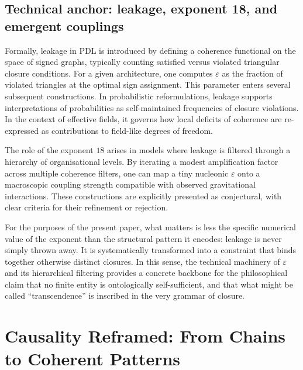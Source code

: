 \documentclass[11pt,a4paper]{article}
\theoremstyle{definition}
\begin{document}
\subsection{Technical anchor: leakage, exponent 18, and emergent couplings}

Formally, leakage in PDL is introduced by defining a coherence functional on the space of signed graphs, typically counting satisfied versus violated triangular closure conditions.\cite{Laubscher_Leakage_Probability_2024} For a given architecture, one computes \(\varepsilon\) as the fraction of violated triangles at the optimal sign assignment. This parameter enters several subsequent constructions. In probabilistic reformulations, leakage supports interpretations of probabilities as self-maintained frequencies of closure violations.\cite{Laubscher_Leakage_Probability_2024} In the context of effective fields, it governs how local deficits of coherence are re-expressed as contributions to field-like degrees of freedom.\cite{Laubscher_EffectiveFields_2024}

The role of the exponent \(18\) arises in models where leakage is filtered through a hierarchy of organisational levels.\cite{Laubscher_Exponent18_v2_2024} By iterating a modest amplification factor across multiple coherence filters, one can map a tiny nucleonic \(\varepsilon\) onto a macroscopic coupling strength compatible with observed gravitational interactions.\cite{Laubscher_UniversalCoherenceLeakage_2024} These constructions are explicitly presented as conjectural, with clear criteria for their refinement or rejection.\cite{Laubscher_PDL_Position_2024,Laubscher_PDL_GlobalMapping_v6_2024}

For the purposes of the present paper, what matters is less the specific numerical value of the exponent than the structural pattern it encodes: leakage is never simply thrown away. It is systematically transformed into a constraint that binds together otherwise distinct closures. In this sense, the technical machinery of \(\varepsilon\) and its hierarchical filtering provides a concrete backbone for the philosophical claim that no finite entity is ontologically self-sufficient, and that what might be called ``transcendence'' is inscribed in the very grammar of closure.

\section{Causality Reframed: From Chains to Coherent Patterns}
\label{sec:causality}
\end{document}
